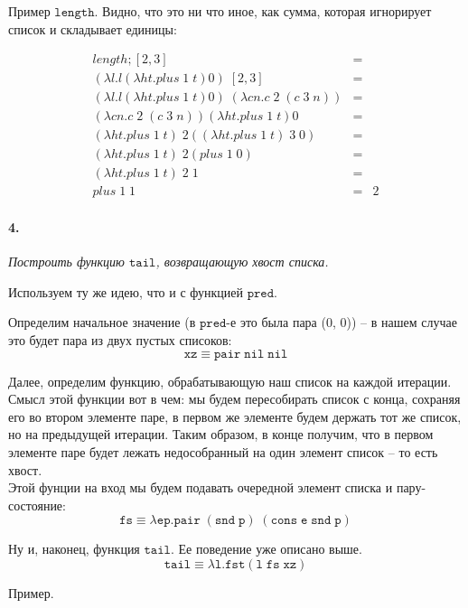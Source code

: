 \documentclass[russian]{article}
\begin{document}
Пример $\mathtt{length}$. Видно, что это ни что иное, как сумма, которая игнорирует список и складывает единицы:

\begin{eqnarray*}
length; [2, 3] & =\\
(\lambda l.l(\lambda ht.plus\; 1\; t)0)\; [2, 3] &=\\
(\lambda l.l(\lambda ht.plus\; 1\; t)0)\; (\lambda cn.c\;2\;(c\;3\;n)) &=\\
(\lambda cn.c\;2\;(c\;3\;n))(\lambda ht.plus\; 1\; t)0 & =\\
(\lambda ht.plus\; 1\; t)\; 2((\lambda ht.plus\; 1\; t)\; 3\; 0) &=\\
(\lambda ht.plus\; 1\; t)\; 2(plus\; 1\; 0) &=\\
(\lambda ht.plus\; 1\; t)\; 2\; 1 &=\\
plus\; 1\; 1 &= &2
\end{eqnarray*}


\paragraph*{4.} \textit{Построить функцию $\mathtt{tail}$, возвращающую хвост списка.}

Используем ту же идею, что и с функцией $\mathtt{pred}$.

Определим начальное значение (в $\mathtt{pred}$-е это была пара (0, 0)) -- в нашем случае это будет пара из двух пустых списоков:
\[
\mathtt{xz \equiv pair\; nil\; nil}
\]

Далее, определим функцию, обрабатывающую наш список на каждой итерации. Смысл этой функции вот в чем: мы будем пересобирать список с конца, сохраняя его во втором элементе паре, в первом же элементе будем держать тот же список, но на предыдущей итерации. Таким образом, в конце получим, что в первом элементе паре будет лежать недособранный на один элемент список -- то есть хвост.\\
Этой фунции на вход мы будем подавать очередной элемент списка и пару-состояние: 
\[
\mathtt{fs \equiv \lambda ep.pair\; (snd\; p)\; (cons\; e\; snd\; p)}
\]

Ну и, наконец, функция $\mathtt{tail}$. Ее поведение уже описано выше.
\[
\mathtt{tail \equiv \lambda l.fst (l\; fs\; xz)}
\]

Пример.
\end{document}
